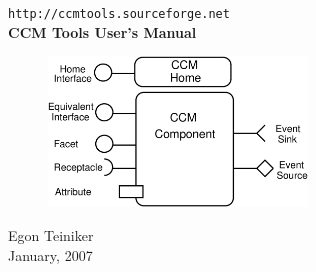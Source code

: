 \begin{titlepage}
\begin{center}

  	\vspace*{3cm}
  	{\LARGE \tt http://ccmtools.sourceforge.net} \\
  	\vspace{2cm}
  	{\huge \bf CCM Tools User's Manual} \\
  	\vspace{15mm}

	\begin{figure}[htbp]
		\begin{center}
			\includegraphics[height=4cm,angle=0] {figures/CCMSymbol}
	  	\end{center}
	\end{figure}
  	
  	\vspace{1cm}
  	{\LARGE Egon Teiniker} \\
  	
  	\vspace{15mm}
  	{\large January, 2007} 

\end{center}
\end{titlepage}
